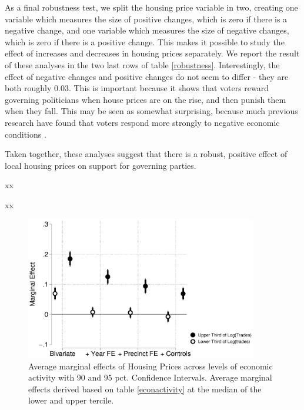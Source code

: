 \documentclass[12pt,a4paper]{article}
\begin{document}
	As a final robustness test, we split the housing price variable in two, creating one variable which measures the size of positive changes, which is zero if there is a negative change, and one variable which measures the size of negative changes, which is zero if there is a positive change. This makes it possible to study the effect of increases and decreases in housing prices separately. We report the result of these analyses in the two last rows of table \ref{robustness}. Interestingly, the effect of negative changes and positive changes do not seem to differ - they are both roughly 0.03. This is important because it shows that voters reward governing politicians when house prices are on the rise, and then punish them when they fall. This may be seen as somewhat surprising, because much previous research have found that voters respond more strongly to negative economic conditions \citep[e.g.][]{bloom1975voter,headrick1991attention,soroka2014negativity}.
	
	Taken together, these analyses suggest that there is a robust, positive effect of local housing prices on support for governing parties.
	
	
	xx 
	
	
	
	
	xx
	
	\begin{figure}[htbp!]
		\includegraphics[width=0.9\textwidth]{../figures/localactivity.eps}
		\centering
		\caption{Average marginal effects of Housing Prices across levels of economic activity with 90  and 95 pct. Confidence Intervals.  Average marginal effects derived based on table \ref{econactivity} at the median of the lower and upper tercile.}\label{comparison}
	\end{figure}
	
\end{document}
